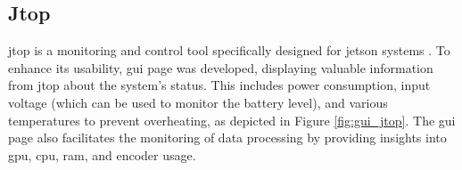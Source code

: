 \subsection{Jtop}
\label{sec:gui_jtop}
\gls{jtop} is a monitoring and control tool specifically designed for \gls{jetson} systems \cite{bonghiJtopRbonghiJetson}.
To enhance its usability, \gls{gui} page was developed, displaying valuable information from \gls{jtop} about the \jx system's status.
This includes power consumption, input voltage (which can be used to monitor the battery level), and various temperatures to prevent overheating, as depicted in Figure \ref{fig:gui_jtop}.
The \gls{gui} page also facilitates the monitoring of data processing by providing insights into \gls{gpu}, \gls{cpu}, \gls{ram}, and encoder usage.

